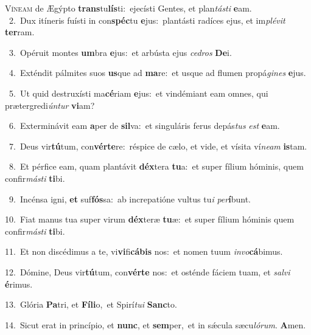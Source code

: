 \lettrine{\initial\textcolor{\initialcolor}{V}}{íneam} de Ægýpto \textbf{trans}\-tu\-\textbf{lís}\-ti:~\star ejecísti Gentes, et plan\-\textit{tás}\-\textit{ti} \textbf{e}\-am.\\
{\numbfont\textcolor{\numbcolor}{~2.}}~Dux itíneris fuísti in con\-\textbf{spéc}\-tu \textbf{e}\-jus:~\star plantásti radíces ejus, et im\-\textit{plé}\-\textit{vit} \textbf{ter}\-ram.\par
{\numbfont\textcolor{\numbcolor}{~3.}}~Opéruit montes \textbf{um}\-bra \textbf{e}\-jus:~\star et arbústa ejus \textit{ce}\-\textit{dros} \textbf{De}\-i.\par
{\numbfont\textcolor{\numbcolor}{~4.}}~Exténdit pálmites suos \textbf{us}\-que ad \textbf{ma}\-re:~\star et usque ad flumen propá\-\textit{gi}\-\textit{nes} \textbf{e}\-jus.\par
{\numbfont\textcolor{\numbcolor}{~5.}}~Ut quid destruxísti ma\-\textbf{cé}\-riam \textbf{e}\-jus:~\star et vindémiant eam omnes, qui prætergredi\-\textit{ún}\-\textit{tur} \textbf{vi}\-am?\par
{\numbfont\textcolor{\numbcolor}{~6.}}~Exterminávit eam \textbf{a}\-per de \textbf{sil}\-va:~\star et singuláris ferus depás\textit{tus} \textit{est} \textbf{e}\-am.\par
{\numbfont\textcolor{\numbcolor}{~7.}}~Deus vir\-\textbf{tú}\-tum, con\-\textbf{vér}\-\textbf{te}re:~\star réspice de cælo, et vide, et vísita ví\-\textit{ne}\-\textit{am} \textbf{is}\-tam.\par
{\numbfont\textcolor{\numbcolor}{~8.}}~Et pérfice eam, quam plantávit \textbf{déx}\-tera \textbf{tu}\-a:~\star et super fílium hóminis, quem confir\-\textit{más}\-\textit{ti} \textbf{ti}\-bi.\par
{\numbfont\textcolor{\numbcolor}{~9.}}~Incénsa igni, \textbf{et} suf\-\textbf{fós}\-sa:~\star ab increpatióne vultus tu\textit{i} \textit{per}\-\textbf{í}bunt.\par
{\numbfont\textcolor{\numbcolor}{10.}}~Fiat manus tua super virum \textbf{déx}\-teræ \textbf{tu}\-æ:~\star et super fílium hóminis quem confir\-\textit{más}\-\textit{ti} \textbf{ti}\-bi.\par
{\numbfont\textcolor{\numbcolor}{11.}}~Et non discédimus a te, vi\-\textbf{vi}\-fi\-\textbf{cá}\-\textbf{bis} nos:~\star et nomen tuum \textit{in}\-\textit{vo}\textbf{cá}bimus.\par
{\numbfont\textcolor{\numbcolor}{12.}}~Dómine, Deus vir\-\textbf{tú}\-tum, con\-\textbf{vér}\-\textbf{te} nos:~\star et osténde fáciem tuam, et \textit{sal}\-\textit{vi} \textbf{é}\-rimus.\par
{\numbfont\textcolor{\numbcolor}{13.}}~Glória \textbf{Pa}\-tri, et \textbf{Fí}\-\textbf{li}o,~\star et Spirí\-\textit{tu}\-\textit{i} \textbf{Sanc}\-to.\par
{\numbfont\textcolor{\numbcolor}{14.}}~Sicut erat in princípio, et \textbf{nunc}\-, et \textbf{sem}\-per,~\star et in sǽcula sæcu\-\textit{ló}\-\textit{rum}. \textbf{A}\-men.\par
